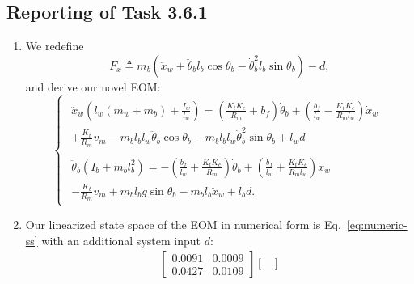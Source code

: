 \documentclass[11pt]{article} %
\begin{document}
\subsection*{Reporting of Task 3.6.1}
\begin{enumerate}
\item %
  We redefine
  $$
  F_x \triangleq m_b\left(
    \ddot{x}_w
    + \ddot{\theta}_b l_b \cos\theta_b
    - \dot{\theta}^2_b l_b \sin\theta_b
  \right)
  - d,
  $$
  and derive our novel \ac{EOM}:
  \begin{equation}\label{eq:system-novel}
    \begin{cases}
      \begin{aligned}
        \ddot{x}_w\left(l_w(m_w + m_b) + \frac{I_w}{l_w}\right) =
        \left(
          \frac{K_t K_e}{R_m}
          + b_f
        \right)\dot{\theta}_b
        +
        \left(
          \frac{b_f}{l_w}
          -
          \frac{K_t K_e}{R_m l_w}
        \right)\dot{x}_w
        \\
        + \frac{K_t}{R_m}v_m
        - m_b l_b l_w \ddot{\theta}_b \cos\theta_b
        - m_b l_b l_w \dot{\theta}_b^2 \sin\theta_b
        + l_w d
      \end{aligned}\\[2.5em]
      \begin{aligned}
        \ddot{\theta}_b\left(I_b + m_b l_b^2\right)
        =
        -\left(
          \frac{b_f}{l_w}
          +
          \frac{K_t K_e}{R_m}
        \right)\dot{\theta}_b
        + \left(
          \frac{b_f}{l_w} + \frac{K_t K_e}{R_m l_w}
        \right)\dot{x}_w
        \\
        - \frac{K_t}{R_m}v_m
        + m_b l_b g \sin\theta_b
        - m_b l_b \ddot{x}_w
        + l_b d.
      \end{aligned}
    \end{cases}
  \end{equation}
\item %
  Our linearized state space of the \ac{EOM} in numerical form is Eq.~\eqref{eq:numeric-ss} with an additional system input $d$:
  \begin{equation*}
    \begin{aligned}
      \begin{bmatrix}
        0.0091 & 0.0009 \\
        0.0427 & 0.0109
      \end{bmatrix}
      \begin{bmatrix}

\end{bmatrix}
\end{aligned}
\end{equation*}
\end{enumerate}
\end{document}

